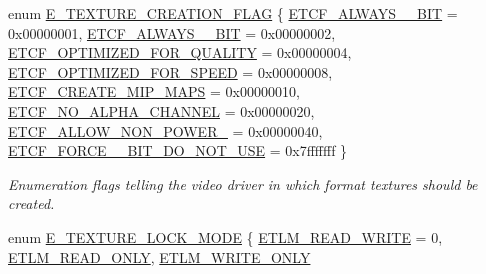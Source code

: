 \begin{DoxyCompactItemize}
\item 
enum \hyperlink{namespaceirr_1_1video_acaf6f7414534f7d62bff18c5bf11876f}{E\+\_\+\+T\+E\+X\+T\+U\+R\+E\+\_\+\+C\+R\+E\+A\+T\+I\+O\+N\+\_\+\+F\+L\+AG} \{ \newline
\hyperlink{namespaceirr_1_1video_acaf6f7414534f7d62bff18c5bf11876fa4fe1c1b0f4b44ef4b5da219ce66a0ae8}{E\+T\+C\+F\+\_\+\+A\+L\+W\+A\+Y\+S\+\_\+\_\+\+B\+IT} = 0x00000001, 
\hyperlink{namespaceirr_1_1video_acaf6f7414534f7d62bff18c5bf11876fa20881e307a778c4a4fbb5327a60a93bb}{E\+T\+C\+F\+\_\+\+A\+L\+W\+A\+Y\+S\+\_\+\_\+\+B\+IT} = 0x00000002, 
\hyperlink{namespaceirr_1_1video_acaf6f7414534f7d62bff18c5bf11876fadc5336eb55e0221ef0d7e53c1cf5a2b9}{E\+T\+C\+F\+\_\+\+O\+P\+T\+I\+M\+I\+Z\+E\+D\+\_\+\+F\+O\+R\+\_\+\+Q\+U\+A\+L\+I\+TY} = 0x00000004, 
\hyperlink{namespaceirr_1_1video_acaf6f7414534f7d62bff18c5bf11876fa01693eaffcfeca7de6fcd7e826a909c3}{E\+T\+C\+F\+\_\+\+O\+P\+T\+I\+M\+I\+Z\+E\+D\+\_\+\+F\+O\+R\+\_\+\+S\+P\+E\+ED} = 0x00000008, 
\newline
\hyperlink{namespaceirr_1_1video_acaf6f7414534f7d62bff18c5bf11876fa288b302e9d4faaba80c7796c7bc1682c}{E\+T\+C\+F\+\_\+\+C\+R\+E\+A\+T\+E\+\_\+\+M\+I\+P\+\_\+\+M\+A\+PS} = 0x00000010, 
\hyperlink{namespaceirr_1_1video_acaf6f7414534f7d62bff18c5bf11876fab9ce08dff03ebff9139b594610561609}{E\+T\+C\+F\+\_\+\+N\+O\+\_\+\+A\+L\+P\+H\+A\+\_\+\+C\+H\+A\+N\+N\+EL} = 0x00000020, 
\hyperlink{namespaceirr_1_1video_acaf6f7414534f7d62bff18c5bf11876fa6a834e40d35e01205ab63f3ce6d71172}{E\+T\+C\+F\+\_\+\+A\+L\+L\+O\+W\+\_\+\+N\+O\+N\+\_\+\+P\+O\+W\+E\+R\+\_} = 0x00000040, 
\hyperlink{namespaceirr_1_1video_acaf6f7414534f7d62bff18c5bf11876fa0081685b8fa033d771f9c6a5bded8253}{E\+T\+C\+F\+\_\+\+F\+O\+R\+C\+E\+\_\+\_\+\+B\+I\+T\+\_\+\+D\+O\+\_\+\+N\+O\+T\+\_\+\+U\+SE} = 0x7fffffff
 \}\begin{DoxyCompactList}\small\item\em Enumeration flags telling the video driver in which format textures should be created. \end{DoxyCompactList}
\item 
enum \hyperlink{namespaceirr_1_1video_a3916d259e8fe0d0d02e8ee0adc8af5bc}{E\+\_\+\+T\+E\+X\+T\+U\+R\+E\+\_\+\+L\+O\+C\+K\+\_\+\+M\+O\+DE} \{ \hyperlink{namespaceirr_1_1video_a3916d259e8fe0d0d02e8ee0adc8af5bca41973750ecd380c9a17fa575262f5037}{E\+T\+L\+M\+\_\+\+R\+E\+A\+D\+\_\+\+W\+R\+I\+TE} = 0, 
\hyperlink{namespaceirr_1_1video_a3916d259e8fe0d0d02e8ee0adc8af5bca2b06fa431c7bae8ea7f844f188beaf6b}{E\+T\+L\+M\+\_\+\+R\+E\+A\+D\+\_\+\+O\+N\+LY}, 
\hyperlink{namespaceirr_1_1video_a3916d259e8fe0d0d02e8ee0adc8af5bca44730dab3af80ddd64d81c85df911ca2}{E\+T\+L\+M\+\_\+\+W\+R\+I\+T\+E\+\_\+\+O\+N\+LY}

\end{DoxyCompactItemize}
